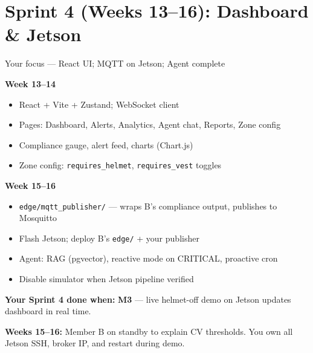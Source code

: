 \documentclass[12pt,a4paper]{article}
\begin{document}
\section{Sprint 4 (Weeks 13--16): Dashboard \& Jetson}

\begin{sprintbox}{{Your focus --- React UI; MQTT on Jetson; Agent complete}}

\begin{taskbox}
\textbf{Week 13--14}
\begin{itemize}
    \item React + Vite + Zustand; WebSocket client
    \item Pages: Dashboard, Alerts, Analytics, Agent chat, Reports, Zone config
    \item Compliance gauge, alert feed, charts (Chart.js)
    \item Zone config: \texttt{requires\_helmet}, \texttt{requires\_vest} toggles
\end{itemize}
\end{taskbox}

\begin{taskbox}
\textbf{Week 15--16}
\begin{itemize}
    \item \texttt{edge/mqtt\_publisher/} --- wraps B's compliance output, publishes to Mosquitto
    \item Flash Jetson; deploy B's \texttt{edge/} + your publisher
    \item Agent: RAG (pgvector), reactive mode on CRITICAL, proactive cron
    \item Disable simulator when Jetson pipeline verified
\end{itemize}
\end{taskbox}

\begin{deliverablebox}
\textbf{Your Sprint 4 done when:} \textbf{M3} --- live helmet-off demo on Jetson updates dashboard in real time.
\end{deliverablebox}

\begin{collabbox}
\textbf{Weeks 15--16:} Member B on standby to explain CV thresholds. You own all Jetson SSH, broker IP, and restart during demo.
\end{collabbox}

\end{sprintbox}
\end{document}
